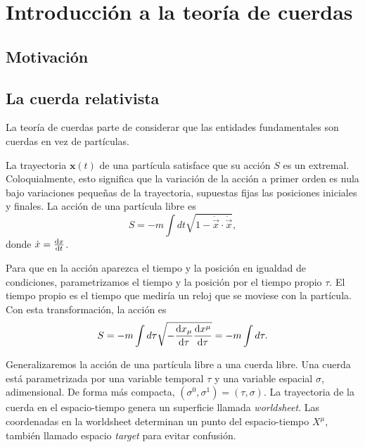 \chapter{Introducción a la teoría de cuerdas}


\section{Motivación}




\section{La cuerda relativista}


La teoría de cuerdas parte de considerar que las entidades fundamentales son cuerdas
en vez de partículas. 


La trayectoria $\mathbf x(t)$ de una partícula satisface que su acción $S$ es un extremal.
Coloquialmente, esto significa que la variación de la acción a primer orden es nula bajo
variaciones pequeñas de la trayectoria, supuestas fijas las posiciones iniciales y finales.
La acción de una partícula libre es
\begin{equation}
  S=-m\int dt \sqrt{1-\dot {\vec{x}} \cdot \dot {\vec{x}}},
\end{equation}
donde $\dot x = \dv{x}{t}$.

Para que en la acción aparezca el tiempo y la posición en igualdad de condiciones,
parametrizamos el tiempo y la posición por el tiempo propio $\tau$. 
El tiempo propio es el tiempo que mediría un reloj que se moviese con la partícula.
Con esta transformación, la acción es
\begin{equation}
 S = -m\int d\tau \sqrt{-\dv{x_\mu}{\tau}\dv{x^\mu}{\tau}}=-m\int d\tau .
\end{equation}


Generalizaremos la acción de una partícula libre a una cuerda libre.
Una cuerda está parametrizada por una variable temporal $\tau$ y una variable espacial $\sigma$, adimensional.
De forma más compacta, $(\sigma^0,\sigma^1)=(\tau,\sigma)$. 
La trayectoria de la cuerda en el espacio-tiempo genera un superficie llamada \emph{worldsheet}.
Las coordenadas en la worldsheet determinan un punto del espacio-tiempo $X^\mu$, también llamado
espacio \emph{target} para evitar confusión.

